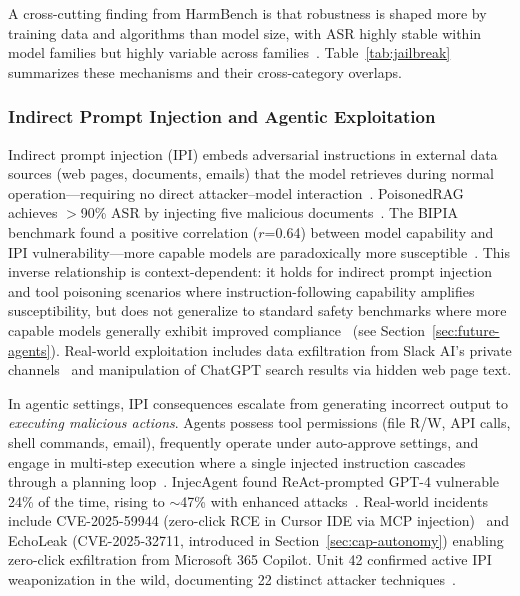 A cross-cutting finding from HarmBench is that robustness is shaped more by training data and algorithms than model size, with ASR highly stable within model families but highly variable across families~\cite{mazeika2024harmbench}. Table~\ref{tab:jailbreak} summarizes these mechanisms and their cross-category overlaps.




\subsubsection{Indirect Prompt Injection and Agentic Exploitation}
\label{sec:threat-ipi}

Indirect prompt injection (IPI) embeds adversarial instructions in external data sources (web pages, documents, emails) that the model retrieves during normal operation---requiring no direct attacker--model interaction~\cite{greshake2023ipi}. PoisonedRAG achieves $>$90\% ASR by injecting five malicious documents~\cite{zou2025poisonedrag}. The BIPIA benchmark found a positive correlation ($r$=0.64) between model capability and IPI vulnerability---more capable models are paradoxically more susceptible~\cite{yi2025bipia}. This inverse relationship is context-dependent: it holds for indirect prompt injection and tool poisoning scenarios where instruction-following capability amplifies susceptibility, but does not generalize to standard safety benchmarks where more capable models generally exhibit improved compliance~\cite{rottger2024xstest} (see Section~\ref{sec:future-agents}). Real-world exploitation includes data exfiltration from Slack AI's private channels~\cite{promptarmor2024slack} and manipulation of ChatGPT search results via hidden web page text.

In agentic settings, IPI consequences escalate from generating incorrect output to \emph{executing malicious actions}. Agents possess tool permissions (file R/W, API calls, shell commands, email), frequently operate under auto-approve settings, and engage in multi-step execution where a single injected instruction cascades through a planning loop~\cite{schneider2025promptware}. InjecAgent found ReAct-prompted GPT-4 vulnerable 24\% of the time, rising to $\sim$47\% with enhanced attacks~\cite{zhan2024injecagent}. Real-world incidents include CVE-2025-59944 (zero-click RCE in Cursor IDE via MCP injection)~\cite{lakera2025cursor} and EchoLeak (CVE-2025-32711, introduced in Section~\ref{sec:cap-autonomy}) enabling zero-click exfiltration from Microsoft 365 Copilot. Unit 42 confirmed active IPI weaponization in the wild, documenting 22 distinct attacker techniques~\cite{unit42ipi2026}.

